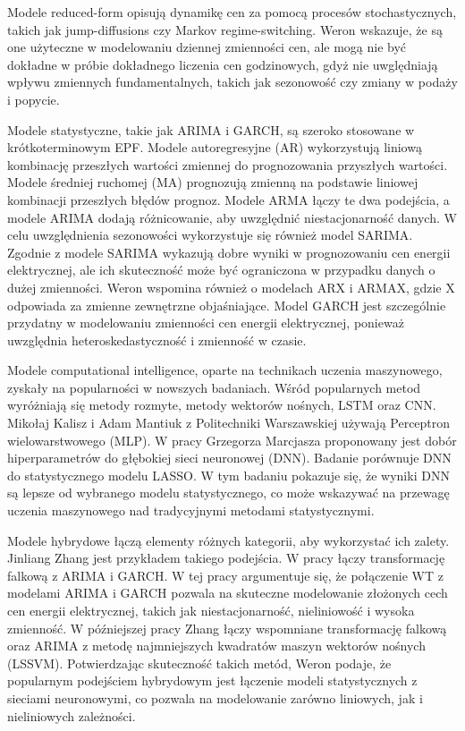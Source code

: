 Modele reduced-form opisują dynamikę cen za pomocą procesów stochastycznych, takich jak jump-diffusions czy Markov regime-switching. Weron \cite{WERON20141030} wskazuje, że są one użyteczne w modelowaniu dziennej zmienności cen, ale mogą nie być dokładne w próbie dokładnego liczenia cen godzinowych, gdyż nie uwględniają wpływu zmiennych fundamentalnych, takich jak sezonowość czy zmiany w podaży i popycie.

Modele statystyczne, takie jak ARIMA i GARCH, są szeroko stosowane w krótkoterminowym EPF. Modele autoregresyjne (AR) wykorzystują liniową kombinację przeszłych wartości zmiennej do prognozowania przyszłych wartości. Modele średniej ruchomej (MA) prognozują zmienną na podstawie liniowej kombinacji przeszłych błędów prognoz. Modele ARMA łączy te dwa podejścia, a modele ARIMA dodają różnicowanie, aby uwzględnić niestacjonarność danych. W celu uwzględnienia sezonowości wykorzystuje się również model SARIMA. Zgodnie z \cite{appliedmath3020018} modele SARIMA wykazują dobre wyniki w prognozowaniu cen energii elektrycznej, ale ich skuteczność może być ograniczona w przypadku danych o dużej zmienności. Weron \cite{WERON20141030} wspomina również o modelach ARX i ARMAX, gdzie X odpowiada za zmienne zewnętrzne objaśniające. Model GARCH jest szczególnie przydatny w modelowaniu zmienności cen energii elektrycznej, ponieważ uwzględnia heteroskedastyczność i zmienność w czasie.

Modele computational intelligence, oparte na technikach uczenia maszynowego, zyskały na popularności w nowszych badaniach. Wśród popularnych metod wyróżniają się metody rozmyte, metody wektorów nośnych, LSTM oraz CNN. Mikołaj Kalisz i Adam Mantiuk z Politechniki Warszawskiej \cite{MGR2025} używają Perceptron wielowarstwowego (MLP). W pracy Grzegorza Marcjasza \cite{en13184605} proponowany jest dobór hiperparametrów do głębokiej sieci neuronowej (DNN). Badanie porównuje DNN do statystycznego modelu LASSO. W tym badaniu pokazuje się, że wyniki DNN są lepsze od wybranego modelu statystycznego, co może wskazywać na przewagę uczenia maszynowego nad tradycyjnymi metodami statystycznymi.

Modele hybrydowe łączą elementy różnych kategorii, aby wykorzystać ich zalety. Jinliang Zhang jest przykładem takiego podejścia. W pracy \cite{TAN20103606} łączy transformację falkową z ARIMA i GARCH. W tej pracy argumentuje się, że połączenie WT z modelami ARIMA i GARCH pozwala na skuteczne modelowanie złożonych cech cen energii elektrycznej, takich jak niestacjonarność, nieliniowość i wysoka zmienność. W późniejszej pracy Zhang \cite{ZHANG2012695} łączy wspomniane transformację falkową oraz ARIMA z metodę najmniejszych kwadratów maszyn wektorów nośnych (LSSVM). Potwierdzając skuteczność takich metód, Weron \cite{WERON20141030} podaje, że popularnym podejściem hybrydowym jest łączenie modeli statystycznych z sieciami neuronowymi, co pozwala na modelowanie zarówno liniowych, jak i nieliniowych zależności.

